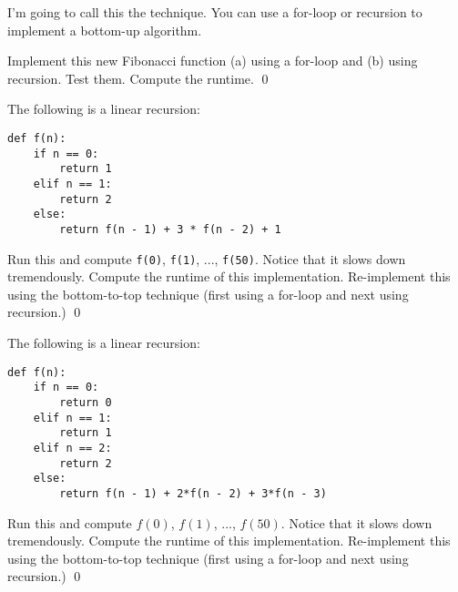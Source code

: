 I'm going to call this the  technique. 
You can use a for-loop or recursion to implement a
bottom-up algorithm.


\newpage
\begin{ex}
Implement this new Fibonacci function (a) using a for-loop and 
(b) using recursion.
Test them.
Compute the runtime.
\qed
\end{ex}


\newpage
\begin{ex}
The following is a linear recursion:
\begin{Verbatim}[frame=single, fontsize=\footnotesize]
def f(n):
    if n == 0:
        return 1
    elif n == 1:
        return 2
    else:
        return f(n - 1) + 3 * f(n - 2) + 1
\end{Verbatim}
Run this and compute \verb!f(0)!, \verb!f(1)!, ..., \verb!f(50)!.
Notice that it slows down tremendously.
Compute the runtime of this implementation.
Re-implement this using the bottom-to-top technique
(first using a for-loop and next using recursion.)
\qed
\end{ex}


\newpage
\begin{ex}
The following is a linear recursion:
\begin{Verbatim}[frame=single, fontsize=\footnotesize]
def f(n):
    if n == 0:
        return 0
    elif n == 1:
        return 1
    elif n == 2:
        return 2
    else:
        return f(n - 1) + 2*f(n - 2) + 3*f(n - 3) 
\end{Verbatim}
Run this and compute $f(0)$, $f(1)$, ..., $f(50)$.
Notice that it slows down tremendously.
Compute the runtime of this implementation.
Re-implement this using the bottom-to-top technique
(first using a for-loop and next using recursion.)
\qed
\end{ex}

%
